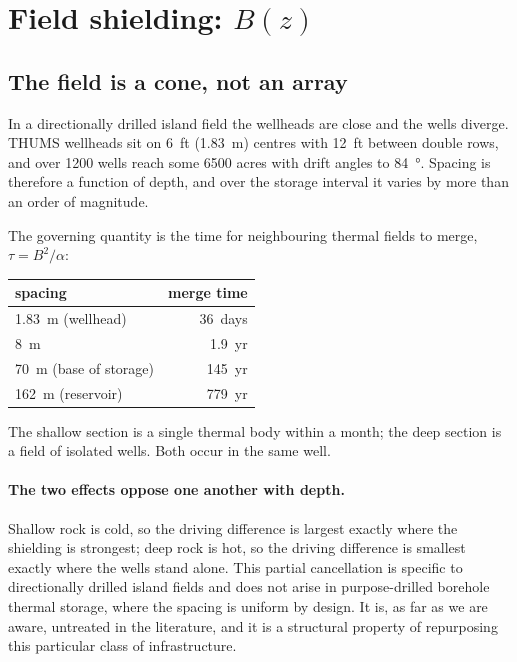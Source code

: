 \section{Field shielding: $B(z)$}
\label{sec:field}

\subsection{The field is a cone, not an array}

In a directionally drilled island field the wellheads are close and the wells
diverge. THUMS wellheads sit on \SI{6}{ft} (\SI{1.83}{\metre}) centres with
\SI{12}{ft} between double rows, and over 1200 wells reach some 6500 acres
with drift angles to \SI{84}{\degree}. Spacing is therefore a function of
depth, and over the storage interval it varies by more than an order of
magnitude.

The governing quantity is the time for neighbouring thermal fields to merge,
$\tau = B^{2}/\alpha$:

\begin{center}
\begin{tabular}{lr}
\toprule
spacing & merge time \\
\midrule
\SI{1.83}{\metre} (wellhead) & \SI{36}{days} \\
\SI{8}{\metre}               & \SI{1.9}{yr}  \\
\SI{70}{\metre} (base of storage) & \SI{145}{yr} \\
\SI{162}{\metre} (reservoir) & \SI{779}{yr}  \\
\bottomrule
\end{tabular}
\end{center}

The shallow section is a single thermal body within a month; the deep section
is a field of isolated wells. Both occur in the same well.

\paragraph{The two effects oppose one another with depth.} Shallow rock is
cold, so the driving difference is largest exactly where the shielding is
strongest; deep rock is hot, so the driving difference is smallest exactly
where the wells stand alone. This partial cancellation is specific to
directionally drilled island fields and does not arise in purpose-drilled
borehole thermal storage, where the spacing is uniform by design. It is, as
far as we are aware, untreated in the literature, and it is a structural
property of repurposing this particular class of infrastructure.

